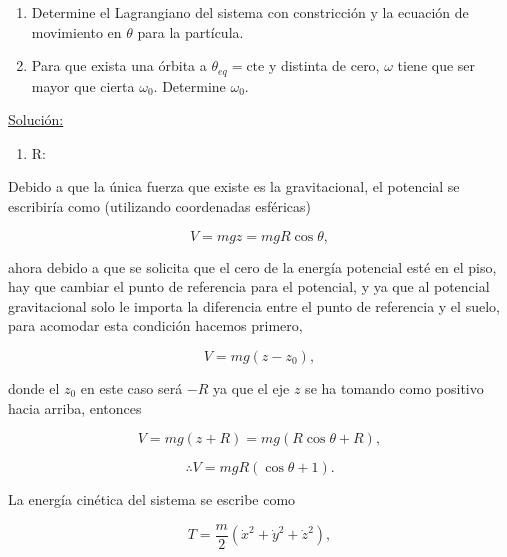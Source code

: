\documentclass[a4paper,10pt]{article}
\numberwithin{equation}{section}
\begin{document}
\begin{enumerate}[label=\alph*)]
 \item Determine el Lagrangiano del sistema con constricción y la ecuación de movimiento 
 en $\theta$ para la partícula.
 \item Para que exista una órbita a $\theta_{eq}= \text{cte}$ y distinta de cero, $\omega$
 tiene que ser mayor que cierta $\omega_0$. Determine $\omega_0$.
\end{enumerate}

\vspace{.3cm}

\underline{Solución:} \vspace{.3cm}

\begin{enumerate}[label=\alph*)]
 \item R:
\end{enumerate}

Debido a que la única fuerza que existe es la gravitacional, el potencial se 
escribiría como (utilizando coordenadas esféricas)

\begin{equation}
 V = mgz = mgR\cos{\theta},
\end{equation}

ahora debido a que se solicita que el cero de la energía potencial esté en el piso, 
hay que cambiar el punto de referencia para el potencial, y ya que al potencial 
gravitacional solo le importa la diferencia entre el punto de referencia y el suelo, 
para acomodar esta condición hacemos primero,

\begin{equation}
 V = mg(z - z_0),
\end{equation}

donde el $z_0$ en este caso será $-R$ ya que el eje $z$ se ha tomando como positivo 
hacia arriba, entonces 

\begin{equation}
 V = mg(z + R) = mg(R\cos{\theta} + R),
\end{equation}

\begin{equation}
 \therefore V = mgR(\cos{\theta} + 1).
\end{equation}

La energía cinética del sistema se escribe como 

\begin{equation}
 T = \frac{m}{2}(\dot{x}^2 + \dot{y}^2 + \dot{z}^2),
\end{equation}
\end{document}
